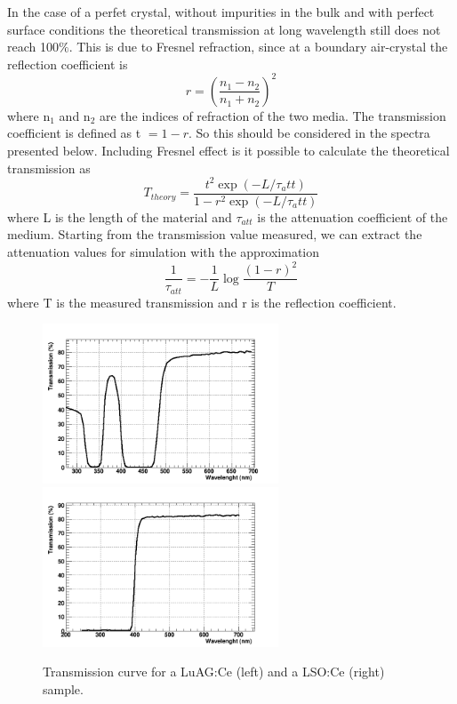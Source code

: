 In the case of a perfet crystal, without impurities in the bulk and with perfect surface conditions the theoretical transmission at long wavelength still does not reach 100$\%$. This is due to Fresnel refraction, since at a boundary air-crystal the reflection coefficient is
\begin{equation}
r = \left( \frac{n_{1}-n_{2}}{n_{1}+n_{2}} \right) ^{2}
\end{equation}
where n$_{1}$ and n$_{2}$ are the indices of refraction of the two media. The transmission coefficient is defined as t $= 1-r$.
So this should be considered in the spectra presented below.
Including Fresnel effect is it possible to calculate the theoretical transmission as
\begin{equation}
T_{theory}=\frac{t^{2} \exp{\left( -L/\tau {_att} \right)}}{1-r^{2}\exp{\left( -L/\tau {_att} \right)}}
\end{equation}
where L is the length of the material and $\tau _{att}$ is the attenuation coefficient of the medium.
Starting from the transmission value measured, we can extract the attenuation values for simulation with the approximation
\begin{equation}
\frac{1}{\tau _{att}} = -\frac{1}{L} \log{\frac{(1-r)^{2}}{T}}
\end{equation}
where T is the measured transmission and r is the reflection coefficient.
\begin{figure}[htbp]
\begin{center}
\includegraphics[width=7cm]{../Pictures/Chapter_5/trans_luag.png}
\includegraphics[width=7cm]{../Pictures/Chapter_5/lso_trans.png}
\end{center}
\caption[Transmission curve for LuAG and LSO]{Transmission curve for a LuAG:Ce (left) and a LSO:Ce (right) sample.}
\label{fig:luag_lso_trans}
\end{figure}

